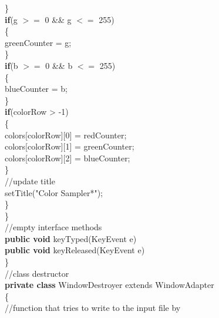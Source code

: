 \documentclass[12pt]{article}
\begin{document}
\begin{flushleft}
{\qquad \qquad \qquad \qquad \qquad					\}\\
\qquad \qquad \qquad \qquad \qquad					\textbf{if}(g $>=$ 0 \&\& g $<=$ 255)\\
\qquad \qquad \qquad \qquad \qquad					\{\\
\qquad \qquad \qquad \qquad \qquad \qquad	greenCounter = g;\\  
\qquad \qquad \qquad \qquad \qquad					\}\\
\qquad \qquad \qquad \qquad \qquad					\textbf{if}(b $>=$ 0 \&\& b $<=$ 255)\\
\qquad \qquad \qquad \qquad \qquad					\{\\
\qquad \qquad \qquad \qquad \qquad \qquad	blueCounter = b;\\  
\qquad \qquad \qquad \qquad \qquad					\}\\
					[2mm]
\qquad \qquad \qquad \qquad \qquad					\textbf{if}(colorRow > -1)\\
\qquad \qquad \qquad \qquad \qquad					\{\\
\qquad \qquad \qquad \qquad \qquad \qquad	colors[colorRow][0] = redCounter;\\
\qquad \qquad \qquad \qquad \qquad \qquad	colors[colorRow][1] = greenCounter;\\
\qquad \qquad \qquad \qquad \qquad \qquad	colors[colorRow][2] = blueCounter;\\
\qquad \qquad \qquad \qquad \qquad	\}\\
					[2mm]
\qquad \qquad \qquad \qquad \qquad					//update title\\
\qquad \qquad \qquad \qquad \qquad					setTitle("Color Sampler*");\\
\qquad \qquad \qquad \qquad 				\}\\
\qquad \qquad \qquad 			\}\\
			[2mm]
\qquad \qquad \qquad 			//empty interface methods\\    
\qquad \qquad \qquad 			\textbf{public void} keyTyped(KeyEvent e){}\\
\qquad \qquad \qquad 			\textbf{public void} keyReleased(KeyEvent e){}\\
\qquad \qquad 		\}\\
		[2mm]
\qquad \qquad 	//class destructor\\                                
\qquad \qquad 	\textbf{private class} WindowDestroyer extends WindowAdapter\\
\qquad \qquad 	\{\\    
\qquad \qquad  \qquad	//function that tries to write to the input file by\\ 
}
\end{flushleft}
\end{document}
